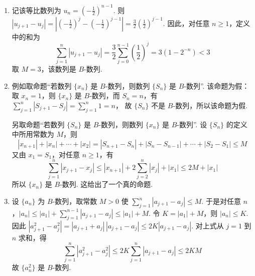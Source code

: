 \begin{solution}
\begin{enumerate}
\item 记该等比数列为 \(u_n=\left(-\frac12\right)^{n-1}\). 则 \(|u_{j+1}-u_j|=\left|\left(-\frac12\right)^j-\left(-\frac12\right)^{j-1}\right|=\frac32\left(\frac12\right)^{j-1}\).
因此，对任意 \(n\geq1\)，定义中的和为
\[
\sum_{j=1}^{n}|u_{j+1}-u_j|
=\frac32\sum_{j=0}^{n-1}\left(\frac12\right)^j
=3\left(1-2^{-n}\right)<3
\]
取 \(M=3\)，该数列是 \(B\)-数列.

\item 例如取命题“若数列 \(\{x_n\}\) 是 \(B\)-数列，则数列 \(\{S_n\}\) 是 \(B\)-数列”. 该命题为假：取 \(x_n=1\)，则 \(\{x_n\}\) 是 \(B\)-数列，而 \(S_n=n\)，有 \(\sum_{j=1}^{n}|S_{j+1}-S_j|=\sum_{j=1}^{n}1=n\)，
故 \(\{S_n\}\) 不是 \(B\)-数列，所以该命题为假.

另取命题“若数列 \(\{S_n\}\) 是 \(B\)-数列，则数列 \(\{x_n\}\) 是 \(B\)-数列”. 设 \(\{S_n\}\) 的定义中所用常数为 \(M\)，则
\[
|x_{n+1}|+|x_n|+\cdots+|x_2|
=|S_{n+1}-S_n|+|S_n-S_{n-1}|+\cdots+|S_2-S_1|\leq M
\]
又由 \(x_1=S_1\)，对任意 \(n\geq1\)，有
\[
\sum_{j=1}^{n}|x_{j+1}-x_j|
\leq |x_{n+1}|+2\sum_{j=2}^{n}|x_j|+|x_1|
\leq 2M+|x_1|
\]
所以 \(\{x_n\}\) 是 \(B\)-数列. 这给出了一个真的命题.

\item 设 \(\{a_n\}\) 为 \(B\)-数列，取常数 \(M>0\) 使 \(\sum_{j=1}^{n}|a_{j+1}-a_j|\leq M\). 于是对任意 \(n\)，\(|a_n|\leq |a_1|+\sum_{j=1}^{n-1}|a_{j+1}-a_j|\leq |a_1|+M\).
令 \(K=|a_1|+M\)，则 \(|a_n|\leq K\). 因此 \(|a_{j+1}^2-a_j^2|=|a_{j+1}+a_j|\,|a_{j+1}-a_j|\leq 2K|a_{j+1}-a_j|\).
对上式从 \(j=1\) 到 \(n\) 求和，得
\[
\sum_{j=1}^{n}|a_{j+1}^2-a_j^2|
\leq 2K\sum_{j=1}^{n}|a_{j+1}-a_j|\leq 2KM
\]
故 \(\{a_n^2\}\) 是 \(B\)-数列.
\end{enumerate}
\end{solution}
